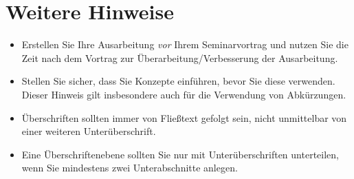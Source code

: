 \section{Weitere Hinweise}
\begin{itemize}
\item Erstellen Sie Ihre Ausarbeitung \emph{vor} Ihrem Seminarvortrag und nutzen Sie die Zeit nach
  dem Vortrag zur Überarbeitung/Verbesserung der Ausarbeitung.
\item Stellen Sie sicher, dass Sie Konzepte einführen, bevor Sie diese verwenden. Dieser Hinweis
  gilt insbesondere auch für die Verwendung von Abkürzungen.
\item Überschriften sollten immer von Fließtext gefolgt sein, nicht unmittelbar von einer weiteren
  Unterüberschrift.
\item Eine Überschriftenebene sollten Sie nur mit Unterüberschriften unterteilen, wenn Sie
  mindestens zwei Unterabschnitte anlegen.
\end{itemize}
